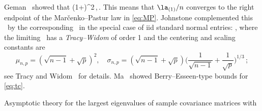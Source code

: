 Geman~\cite{geman} showed that
\beam\label{eq:geman}
 \stas \big(1+\sqrt{\gamma}\big)^2\,,\qquad \nto\,.
\eeam
This means that $\la_{(1)}/n$ converges to the right endpoint of the Mar\v cenko--Pastur law in \eqref{eq:MP}.
Johnstone \cite{johnstone:2001} complemented this \slln\ by the corresponding \clt\ in the special case of iid standard normal 
entries:
\beam\label{eq:tc}
 \cid \xi,
\eeam
where the limiting \rv\ has a {\em Tracy--Widom \ds} of order 1 and the centering and scaling constants are
\begin{equation*}
\mu_{n,p}=(\sqrt{n-1}+ \sqrt{p})^2, \quad \sigma_{n,p}=(\sqrt{n-1}+ \sqrt{p}) \Big( \frac{1}{\sqrt{n-1}} +\frac{1}{\sqrt{p}}\Big)^{1/3}\,;
\end{equation*}
see Tracy and Widom~\cite{tracy:widom:2012} for details. 
Ma~\cite{zongming:2012} showed Berry--Esseen-type bounds for  
\eqref{eq:tc}. %
\par
Asymptotic theory for the largest eigenvalues of sample covariance matrices with 
